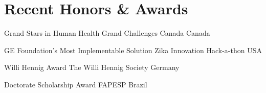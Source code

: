 
\section{Recent Honors \& Awards}

    \vspace{-0.2em}
    
    	{Grand Stars in Human Health}
    	{Grand Challenges Canada}
    	{Canada}
    	{}{}
    
    	{GE Foundation's Most Implementable Solution}
    	{Zika Innovation Hack-a-thon}
    	{USA}
    	{}{}
    
    	{Willi Hennig Award}
    	{The Willi Hennig Society}
    	{Germany}
    	{}{}
    
    	{Doctorate Scholarship Award}
    	{FAPESP}
    	{Brazil}
    	{}{}
    
    \vspace{-0.8em}